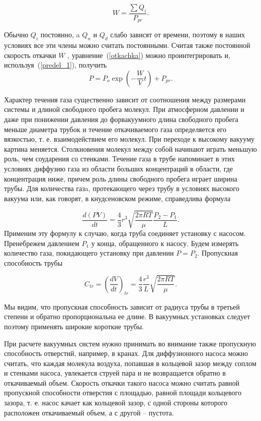 \documentclass[a4paper,12pt]{article} %
\begin{document}
\begin{equation}
\label{predel_2}
	W=\frac{\sum Q_i}{P_{pr}}.
\end{equation}

Обычно $Q_i$ постоянно, a $Q_n$ и $Q_d$ слабо зависят от времени, поэтому в наших условиях все эти члены можно считать постоянными. Считая также постоянной скорость откачки $W$ , уравнение~(\ref{otkachka}) можно проинтегрировать и, используя~(\ref{predel_1}), получить
\begin{equation}
\label{davlenie}
	P = P_o \exp{(-\frac{W}{V} t)} + P_{pr}.
\end{equation}

	Характер течения газа существенно зависит от соотношения между размерами системы и длиной свободного пробега молекул. При атмосферном давлении и даже при понижении давления до форвакуумного длина свободного пробега меньше диаметра трубок и течение откачиваемого газа определяется его вязкостью, т. е. взаимодействием его молекул. При переходе к высокому вакууму картина меняется. Столкновения молекул между собой начинают играть меньшую роль, чем соударения со стенками. Течение газа в трубе напоминает в этих условиях диффузию газа из области больших концентраций в области, где концентрация ниже, причем роль длины свободного пробега играет ширина трубы.
Для количества газa, протекающего через трубу в условиях высокого вакуума или, как говорят, в кнудсеновском режиме, справедлива формула

\begin{equation}
\label{formula}
	\frac{d(PV)}{dt}=\frac{4}{3}r^3 \sqrt{\frac{2\pi RT}{\mu}} \frac{P_2-P_1}{L}.
\end{equation}
Применим эту формулу к случаю, когда труба соединяет установку с насосом.
Пренебрежем давлением $P_1$ у конца, обращенного к насосу. Будем измерять количество газа, покидающего установку при давлении $P = P_2$. Пропускная способность трубы

\begin{equation}
	C_{tr}=(\frac{dV}{dt})_{tr}=\frac{4}{3}\frac{r^3}{L}\sqrt{\frac{2\pi RT}{\mu}}.
\end{equation}

	Мы видим, что пропускная способность зависит от радиуса трубы в третьей степени и обратно пропорциональна ее длине. В вакуумных установках следует поэтому применять широкие короткие  трубы.
	
	При расчете вакуумных систем нужно принимать во внимание также пропускную способность отверстий, например, в кранах. Для диффузионного насоса можно считать, что каждая молекула воздуха, попавшая в кольцевой зазор между соплом и стенками насоса, увлекается струей пара и не возвращается обратно в откачиваемый объем. Скорость откачки такого насоса можно считать равной пропускной способности отверстия с площадью, равной площади кольцевого зазора, т. е. насос качает как кольцевой зазор, с одной стороны которого расположен откачиваемый объем, а с другой -- пустота.
\end{document}
